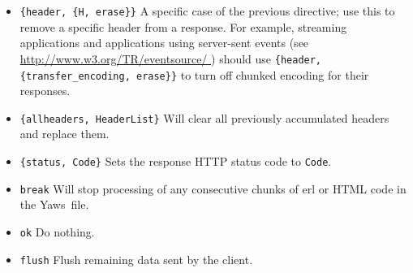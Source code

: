 \documentclass[11pt,oneside,english]{book}
\newcommand{\Yaws}            %
        {{\sc Yaws}}
\begin{document}
\begin{itemize}
\begin{itemize}
      header. If this header is defined, no deflate is performed by \Yaws\ ,
      allowing you to compress data yourself if you wish to do so.
    \item \verb+{content_length, What}+ - Normally \Yaws\ will ship \verb+.yaws+ pages
      using \textit{Transfer-Encoding: chunked}. This is because we generally
      can't know how long a yaws page will be. If we for some reason want to
      force a \textit{Content-Length:} header (and we actually do know the
      length of the content, we can force \Yaws\ to not ship the page chunked.
    \item \verb+{transfer_encoding, What}+ - Sets the
      \textit{Transfer-Encoding:} header.
    \item \verb+{www_authenticate, What}+ - Sets the \textit{WWW-Authenticate:}
      header.
    \item \verb+{vary, What}+ - Sets the \textit{Vary:} header.
    \item \verb+{accept_ranges, What}+ - Sets the \textit{Accept-Ranges:} header.
  \end{itemize}

  All other headers must be added using the normal HTTP syntax. Example:
\begin{verbatim}
{header, {"My-X-Header", "gadong"}} or {header, "My-X-Header: gadong"}
\end{verbatim}

\item \verb+{header, {H, erase}}+ A specific case of the previous
  directive; use this to remove a specific header from a response. For
  example, streaming applications and applications using server-sent events
  (see \url{http://www.w3.org/TR/eventsource/ }) should use
  \verb+{header, {transfer_encoding, erase}}+ to turn off chunked encoding
  for their responses.

\item \verb+{allheaders, HeaderList}+ Will clear all previously
  accumulated headers and replace them.

\item \verb+{status, Code}+ Sets the response HTTP status code to
  \verb+Code+.

\item \verb+break+ Will stop processing of any consecutive chunks of
  erl or HTML code in the \Yaws\ file.

\item \verb+ok+ Do nothing.

\item \verb+flush+ Flush remaining data sent by the client.


\end{itemize}
\end{document}
